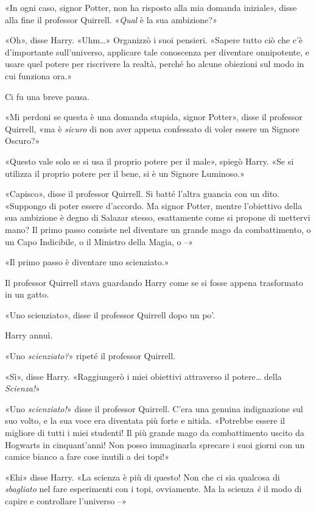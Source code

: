 «In ogni caso, signor Potter, non ha risposto alla mia domanda iniziale», disse alla fine il professor Quirrell. «\textit{Qual} è la sua ambizione?»

«Oh», disse Harry. «Uhm…» Organizzò i suoi pensieri. «Sapere tutto ciò che c’è d’importante sull’universo, applicare tale conoscenza per diventare onnipotente, e usare quel potere per riscrivere la realtà, perché ho alcune obiezioni sul modo in cui funziona ora.»

Ci fu una breve pausa.

«Mi perdoni se questa è una domanda stupida, signor Potter», disse il professor Quirrell, «ma è \textit{sicuro} di non aver appena confessato di voler essere un Signore Oscuro?»

«Questo vale solo se si usa il proprio potere per il male», spiegò Harry. «Se si utilizza il proprio potere per il bene, si è un Signore Luminoso.»

«Capisco», disse il professor Quirrell. Si batté l’altra guancia con un dito. «Suppongo di poter essere d’accordo. Ma signor Potter, mentre l’obiettivo della sua ambizione è degno di Salazar stesso, esattamente come si propone di mettervi mano? Il primo passo consiste nel diventare un grande mago da combattimento, o un Capo Indicibile, o il Ministro della Magia, o –»

«Il primo passo è diventare uno scienziato.»

Il professor Quirrell stava guardando Harry come se si fosse appena trasformato in un gatto.

«Uno scienziato», disse il professor Quirrell dopo un po’.

Harry annuì.

«Uno \textit{scienziato?}» ripeté il professor Quirrell.

«Sì», disse Harry. «Raggiungerò i miei obiettivi attraverso il potere… della \textit{Scienza!}»

«Uno \textit{scienziato!}» disse il professor Quirrell. C’era una genuina indignazione sul suo volto, e la sua voce era diventata più forte e nitida. «Potrebbe essere il migliore di tutti i miei studenti! Il più grande mago da combattimento uscito da Hogwarts in cinquant’anni! Non posso immaginarla sprecare i suoi giorni con un camice bianco a fare cose inutili a dei topi!»

«Ehi» disse Harry. «La scienza è più di questo! Non che ci sia qualcosa di \textit{sbagliato} nel fare esperimenti con i topi, ovviamente. Ma la scienza \textit{è} il modo di capire e controllare l’universo –»

